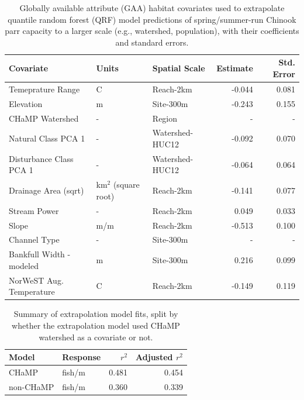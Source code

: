 \documentclass[
  12pt,
]{article}
\begin{document}
\newpage

\begin{table}[!h]

\caption{\label{tab:gaa-covars}Globally available attribute (GAA) habitat covariates used to extrapolate quantile random forest (QRF) model predictions of spring/summer-run Chinook parr capacity to a larger scale (e.g., watershed, population), with their coefficients and standard errors.}
\centering
\begin{tabular}[t]{lllrr}
\toprule
Covariate & Units & Spatial Scale & Estimate & Std. Error\\
\midrule
Temeprature Range & C & Reach-2km & -0.044 & 0.081\\
Elevation & m & Site-300m & -0.243 & 0.155\\
CHaMP Watershed & - & Region & - & -\\
Natural Class PCA 1 & - & Watershed-HUC12 & -0.092 & 0.070\\
Disturbance Class PCA 1 & - & Watershed-HUC12 & -0.064 & 0.064\\
Drainage Area (sqrt) & km$^2$ (square root) & Reach-2km & -0.141 & 0.077\\
Stream Power & - & Reach-2km & 0.049 & 0.033\\
Slope & m/m & Reach-2km & -0.513 & 0.100\\
Channel Type & - & Site-300m & - & -\\
Bankfull Width - modeled & m & Site-300m & 0.216 & 0.099\\
NorWeST Aug. Temperature & C & Reach-2km & -0.149 & 0.119\\
\bottomrule
\end{tabular}
\end{table}

\newpage

\begin{table}[!h]

\caption{\label{tab:extrap-r2-table}Summary of extrapolation model fits, split by whether the extrapolation model used CHaMP watershed as a covariate or not.}
\centering
\begin{tabular}[t]{llrr}
\toprule
Model & Response & $r^2$ & Adjusted $r^2$\\
\midrule
CHaMP & fish/m & 0.481 & 0.454\\
non-CHaMP & fish/m & 0.360 & 0.339\\
\bottomrule
\end{tabular}
\end{table}
\end{document}
